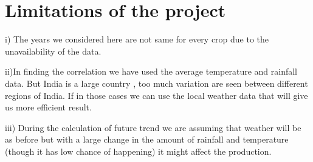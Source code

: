 \section{Limitations of the project}

i) The years we considered here are not same for every crop due to the unavailability of the data.

\vspace{2 mm}
\hspace{-5 mm}ii)In finding the correlation we have used the average temperature and rainfall data. But India is a large country , too much variation are seen between different regions of India. If in those cases we can use the local weather data that will give us more efficient result.

\vspace{2 mm}
\hspace{-5 mm}iii) During the calculation of future trend we are assuming that weather will be as before but with a large change in the amount of rainfall and temperature (though it has low chance of happening) it might affect the production.
